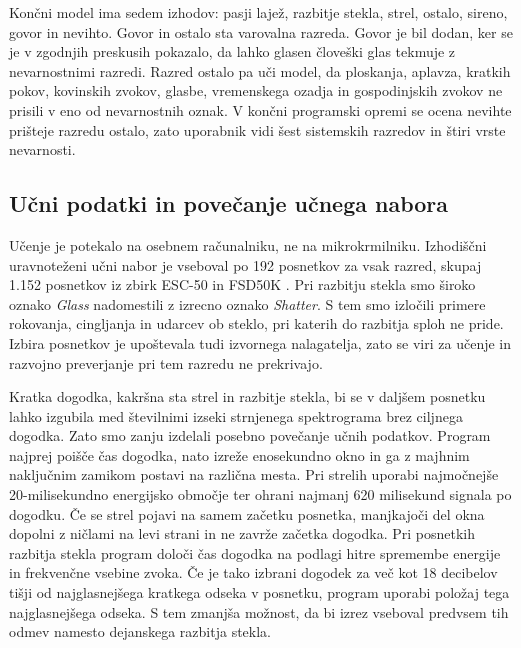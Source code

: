 Končni model ima sedem izhodov: pasji lajež, razbitje stekla, strel, ostalo,
sireno, govor in nevihto. Govor in ostalo sta
varovalna razreda. Govor je bil dodan, ker se je v zgodnjih preskusih pokazalo,
da lahko glasen človeški glas tekmuje z nevarnostnimi razredi. Razred ostalo pa
uči model, da ploskanja, aplavza, kratkih pokov, kovinskih zvokov, glasbe,
vremenskega ozadja in gospodinjskih zvokov ne prisili v eno od nevarnostnih
oznak. V končni programski opremi se ocena nevihte prišteje razredu ostalo,
zato uporabnik vidi šest sistemskih razredov in štiri vrste nevarnosti.

\subsection{Učni podatki in povečanje učnega nabora}

Učenje je potekalo na osebnem računalniku, ne na mikrokrmilniku. Izhodiščni
uravnoteženi učni nabor je vseboval po 192 posnetkov za vsak razred, skupaj
1.152 posnetkov iz zbirk ESC-50 in FSD50K
\cite{piczak2015esc50,fonseca2022fsd50k}. Pri razbitju stekla smo široko
oznako \emph{Glass} nadomestili z izrecno oznako \emph{Shatter}. S tem smo
izločili primere rokovanja, cingljanja in udarcev ob steklo, pri katerih do
razbitja sploh ne pride. Izbira posnetkov je upoštevala tudi izvornega
nalagatelja, zato se viri za učenje in razvojno preverjanje pri tem razredu ne
prekrivajo.

Kratka dogodka, kakršna sta strel in razbitje stekla, bi se v daljšem posnetku
lahko izgubila med številnimi izseki strnjenega spektrograma brez ciljnega dogodka.
Zato smo zanju izdelali posebno povečanje učnih podatkov. Program
 najprej
poišče čas dogodka, nato izreže enosekundno okno in ga z majhnim naključnim
zamikom postavi na različna mesta. Pri strelih uporabi najmočnejše
20-milisekundno energijsko območje ter ohrani najmanj 620 milisekund signala po
dogodku. Če se strel pojavi na samem začetku posnetka, manjkajoči del okna
dopolni z ničlami na levi strani in ne zavrže začetka dogodka. Pri posnetkih
razbitja stekla program določi čas dogodka na podlagi hitre spremembe energije
in frekvenčne vsebine zvoka. Če je tako izbrani dogodek za več kot 18 decibelov
tišji od najglasnejšega kratkega odseka v posnetku, program uporabi položaj tega
najglasnejšega odseka. S tem zmanjša možnost, da bi izrez vseboval predvsem tih
odmev namesto dejanskega razbitja stekla.

